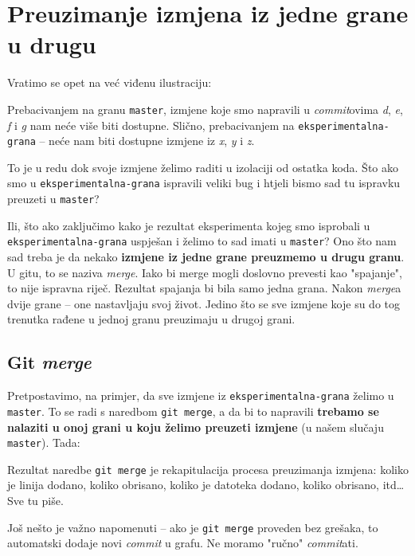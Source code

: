 \chapter*{Preuzimanje izmjena iz jedne grane u drugu}

Vratimo se opet na već viđenu ilustraciju:



Prebacivanjem na granu \verb+master+, izmjene koje smo napravili u \emph{commit}ovima \emph d, \emph e, \emph f i \emph g nam neće više biti dostupne.
Slično, prebacivanjem na \verb+eksperimentalna-grana+ -- neće nam biti dostupne izmjene iz \emph x, \emph y i \emph z.

To je u redu dok svoje izmjene želimo raditi u izolaciji od ostatka koda. 
Što ako smo u \verb+eksperimentalna-grana+ ispravili veliki bug i htjeli bismo sad tu ispravku preuzeti u \verb+master+?

Ili, što ako zaključimo kako je rezultat eksperimenta kojeg smo isprobali u \\
\verb+eksperimentalna-grana+ uspješan i želimo to sad imati u \verb+master+?
Ono što nam sad treba je da nekako \textbf{izmjene iz jedne grane preuzmemo u drugu granu}.
U gitu, to se naziva \emph{merge}.
Iako bi merge mogli doslovno prevesti kao "spajanje", to nije ispravna riječ. 
Rezultat spajanja bi bila samo jedna grana. 
Nakon \emph{merge}a dvije grane -- one nastavljaju svoj život. 
Jedino što se sve izmjene koje su do tog trenutka rađene u jednoj granu preuzimaju u drugoj grani.

\section*{Git \emph{merge}}

Pretpostavimo, na primjer, da sve izmjene iz \verb+eksperimentalna-grana+ želimo u \verb+master+. 
To se radi s naredbom \verb+git merge+, a da bi to napravili \textbf{trebamo se nalaziti u onoj grani u koju želimo preuzeti izmjene} (u našem slučaju \verb+master+).
Tada:



Rezultat naredbe \verb+git merge+ je rekapitulacija procesa preuzimanja izmjena: koliko je linija dodano, koliko obrisano, koliko je datoteka dodano, koliko obrisano, itd\dots
Sve tu piše.

Još nešto je važno napomenuti -- ako je \verb+git merge+ proveden bez grešaka, to automatski dodaje novi \emph{commit} u grafu. 
Ne moramo "ručno" \emph{commit}ati.

